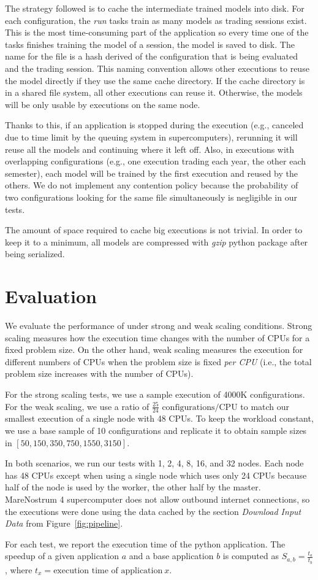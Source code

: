 The strategy followed is to cache the intermediate trained models into disk. For each configuration, the \textit{run} tasks train as many models as trading sessions exist. This is the most time-consuming part of the application so every time one of the tasks finishes training the model of a session, the model is saved to disk. The name for the file is a hash derived of the configuration that is being evaluated and the trading session. 
This naming convention allows other executions to reuse the model directly if they use the same cache directory. If the cache directory is in a shared file system, all other executions can reuse it. Otherwise, the models will be only usable by executions on the same node.

Thanks to this, if an application is stopped during the execution (e.g., canceled due to time limit by the queuing system in supercomputers), rerunning it will reuse all the models and continuing where it left off. Also, in executions with overlapping configurations (e.g., one execution trading each year, the other each semester), each model will be trained by the first execution and reused by the others. We do not implement any contention policy because the probability of two configurations looking for the same file simultaneously is negligible in our tests.

The amount of space required to cache big executions is not trivial. In order to keep it to a minimum, all models are compressed with \textit{gzip} python package after being serialized.

\section{Evaluation}

We evaluate the performance of \HPCsys under strong and weak scaling conditions. Strong scaling measures how the execution time changes with the number of CPUs for a fixed problem size. On the other hand, weak scaling measures the execution for different numbers of CPUs when the problem size is fixed \textit{per CPU} (i.e., the total problem size increases with the number of CPUs). 

For the strong scaling tests, we use a sample execution of 4000K configurations. For the weak scaling, we use a ratio of $ \frac{25}{24} \text{ configurations/CPU}$ to match our smallest execution of a single node with 48 CPUs. To keep the workload constant, we use a base sample of 10 configurations and replicate it to obtain sample sizes in $[50, 150, 350, 750, 1550, 3150]$.

In both scenarios, we run our tests with 1, 2, 4, 8, 16, and 32 nodes. Each node has 48 CPUs except when using a single node which uses only 24 CPUs because half of the node is used by the worker, the other half by the master. MareNostrum 4 supercomputer does not allow outbound internet connections, so the executions were done using the data cached by the section \textit{Download Input Data} from Figure~\ref{fig:pipeline}.

For each test, we report the execution time of the python application. The speedup of a given application $a$ and a base application $b$ is computed as $ S_{a, b} = \frac{t_{a}}{t_{b}} $, where $ t_x=\text{execution time of application}\ x $. 